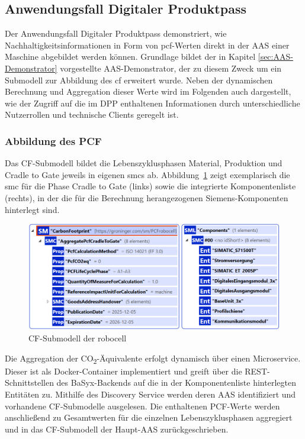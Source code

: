 \newpage
\subsection{Anwendungsfall Digitaler Produktpass}
Der Anwendungsfall Digitaler Produktpass demonstriert, wie Nachhaltigkeitsinformationen in Form von \acs{pcf}-Werten direkt in der AAS einer Maschine abgebildet werden können.
Grundlage bildet der in Kapitel \ref{sec:AAS-Demonstrator} vorgestellte AAS-Demonstrator, der zu diesem Zweck um ein Submodell zur Abbildung des \acs{cf} erweitert wurde.
Neben der dynamischen Berechnung und Aggregation dieser Werte wird im Folgenden auch dargestellt, wie der Zugriff auf die im DPP enthaltenen Informationen durch unterschiedliche Nutzerrollen und technische Clients geregelt ist.

\subsubsection{Abbildung des PCF}
Das CF-Submodell bildet die Lebenszyklusphasen Material, Produktion und Cradle to Gate jeweils in eigenen \acsp{smc} ab.
Abbildung~\ref{fig:SubmodellCF} zeigt exemplarisch die \acs{smc} für die Phase Cradle to Gate (links) sowie die integrierte Komponentenliste (rechts), in der die für die Berechnung herangezogenen Siemens-Komponenten hinterlegt sind.

\begin{figure}[htbp]
    \centering
        \includegraphics[width=1\textwidth]{Bilder/ErgebnissePackageExplorer/CarbonFoorprintTest.png}
    \caption{CF-Submodell der robocell}
    \label{fig:SubmodellCF}
\end{figure}

Die Aggregation der CO\textsubscript{2}-Äquivalente erfolgt dynamisch über einen Microservice. 
Dieser ist als Docker-Container implementiert und greift über die REST-Schnittstellen des BaSyx-Backends auf die in der Komponentenliste hinterlegten Entitäten zu. 
Mithilfe des Discovery Service werden deren AAS identifiziert und vorhandene CF-Submodelle ausgelesen. 
Die enthaltenen PCF-Werte werden anschließend zu Gesamtwerten für die einzelnen Lebenszyklusphasen aggregiert und in das CF-Submodell der Haupt-AAS zurückgeschrieben.

